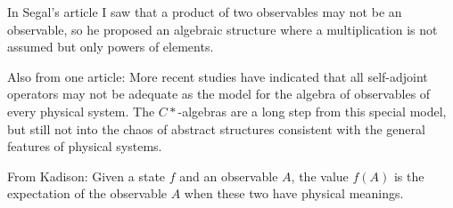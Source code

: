 In Segal's article I saw that a product of two observables may not be an observable, so he proposed an algebraic structure where a multiplication is not assumed but only powers of elements.

Also from one article:
More recent studies have indicated that all self-adjoint operators may not be adequate as the model for the algebra of observables of every physical system. The $C*$-algebras are a long step from this special model, but still not into the chaos of abstract structures consistent with the general features of physical systems. 

From Kadison:
Given a state $f$ and an observable $A$, the value $f(A)$ is the expectation of the observable $A$ when these two have physical meanings.